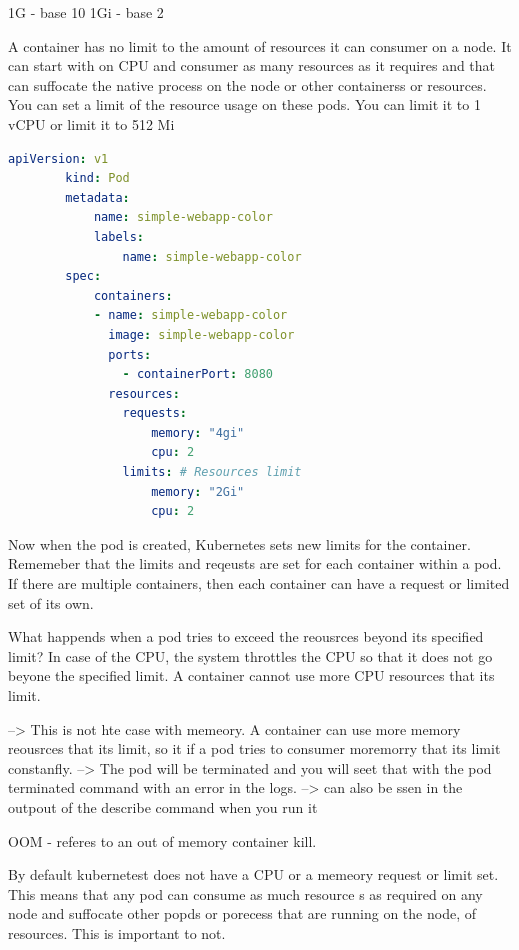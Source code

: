 \documentclass[11pt]{book}
\begin{document}
    1G - base 10
    1Gi - base 2

    A container has no limit to the amount of resources it can consumer on a node.
    It can start with on CPU and consumer as many resources as it requires and that can suffocate the native process on the node or other containerss or resources.
    You can set a limit of the resource usage on these pods.
    You can limit it to 1 vCPU or limit it to 512 Mi

    \begin{lstlisting}[language=yaml, caption={pod-definition.yaml}]
        apiVersion: v1
        kind: Pod
        metadata:
            name: simple-webapp-color
            labels:
                name: simple-webapp-color
        spec:
            containers:
            - name: simple-webapp-color
              image: simple-webapp-color
              ports:
                - containerPort: 8080
              resources:
                requests:
                    memory: "4gi"
                    cpu: 2
                limits: # Resources limit
                    memory: "2Gi"
                    cpu: 2
    \end{lstlisting}

    Now when the pod is created, Kubernetes sets new limits for the container.
    Rememeber that the limits and reqeusts are set for each container within a pod.
    If there are multiple containers, then each container can have a request or limited set of its own.

    What happends when a pod tries to exceed the reousrces beyond its specified limit?
    In case of the CPU, the system throttles the CPU so that it does not go beyone the specified limit.
    A container cannot use more CPU resources that its limit.

    --> This is not hte case with memeory.
    A container can use more memory reousrces that its limit, so it if a pod tries to consumer moremorry that its limit constanfly.
    --> The pod will be terminated and you will seet that with the pod terminated command with an error in the logs.
    --> can also be ssen in the outpout of the describe command when you run it

    OOM - referes to an out of memory container kill.

    By default kubernetest does not have a CPU or a memeory request or limit set.
    This means that any pod can consume as much resource s as required on any node and suffocate other popds or porecess that are running on the node, of resources.
    This is important to not.
\end{document}
